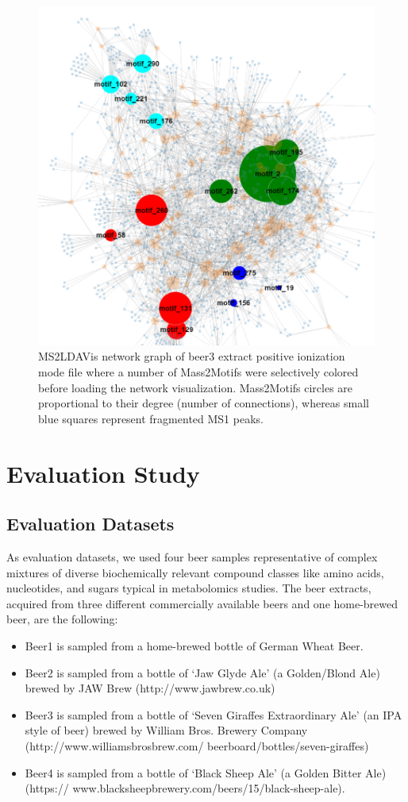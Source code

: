 \begin{figure}[!htbp]
\centering\includegraphics[width=0.8\linewidth]{07-lda/figures/popup.png}
\centering\caption{MS2LDAVis network graph of beer3 extract positive ionization mode file where a number of Mass2Motifs were selectively colored before loading the network visualization. Mass2Motifs circles are proportional to their degree (number of connections), whereas small blue squares represent fragmented MS1 peaks.\label{fig:m2ldavis-popup}}
\end{figure}

\section{Evaluation Study}

\subsection{Evaluation Datasets\label{sub:ms2lda-datasets}}

As evaluation datasets, we used four beer samples representative of complex mixtures of diverse biochemically relevant compound classes like amino acids, nucleotides, and sugars typical in metabolomics studies. The beer extracts, acquired from three different commercially available beers and one home-brewed beer, are the following:
\begin{itemize}
\item Beer1 is sampled from a home-brewed bottle of German Wheat Beer.
\item Beer2 is sampled from a bottle of ‘Jaw Glyde Ale’ (a Golden/Blond Ale) brewed by JAW Brew (http://www.jawbrew.co.uk)
\item Beer3 is sampled from a bottle of ‘Seven Giraffes Extraordinary Ale’ (an IPA style of beer) brewed by William Bros. Brewery Company (http://www.williamsbrosbrew.com/ beerboard/bottles/seven-giraffes)
\item Beer4 is sampled from a bottle of ‘Black Sheep Ale’ (a Golden Bitter Ale)  (https:// www.blacksheepbrewery.com/beers/15/black-sheep-ale).
\end{itemize}


